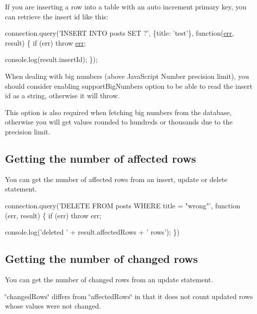 If you are inserting a row into a table with an auto increment primary key, you can retrieve the insert id like this\+:


\begin{DoxyCode}
connection.query(\textcolor{stringliteral}{'INSERT INTO posts SET ?'}, \{title: \textcolor{stringliteral}{'test'}\}, \textcolor{keyword}{function}(\hyperlink{message_8cpp_aede5746344fdce99647541101eaa7f06}{err}, result) \{
  \textcolor{keywordflow}{if} (err) \textcolor{keywordflow}{throw} \hyperlink{message_8cpp_aede5746344fdce99647541101eaa7f06}{err};

  console.log(result.insertId);
\});
\end{DoxyCode}


When dealing with big numbers (above Java\+Script Number precision limit), you should consider enabling {\ttfamily support\+Big\+Numbers} option to be able to read the insert id as a string, otherwise it will throw.

This option is also required when fetching big numbers from the database, otherwise you will get values rounded to hundreds or thousands due to the precision limit.

\subsection*{Getting the number of affected rows}

You can get the number of affected rows from an insert, update or delete statement.


\begin{DoxyCode}
connection.query(\textcolor{stringliteral}{'DELETE FROM posts WHERE title = "wrong"'}, \textcolor{keyword}{function} (err, result) \{
  \textcolor{keywordflow}{if} (err) \textcolor{keywordflow}{throw} err;

  console.log(\textcolor{stringliteral}{'deleted '} + result.affectedRows + \textcolor{stringliteral}{' rows'});
\})
\end{DoxyCode}


\subsection*{Getting the number of changed rows}

You can get the number of changed rows from an update statement.

\char`\"{}changed\+Rows\char`\"{} differs from \char`\"{}affected\+Rows\char`\"{} in that it does not count updated rows whose values were not changed.


